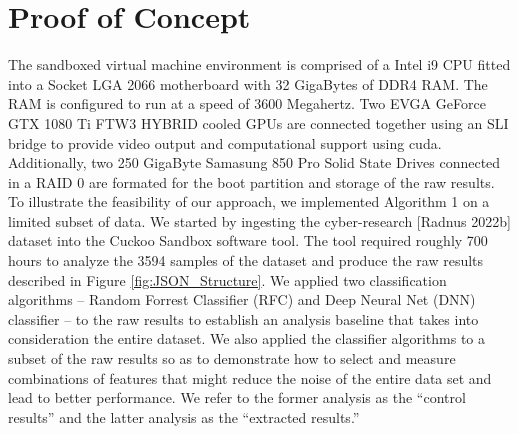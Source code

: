 \documentclass[12pt]{report}
\begin{document}
\section{Proof of Concept}
The sandboxed virtual machine environment is comprised of a Intel i9 CPU fitted into a Socket LGA 2066 motherboard with 32 GigaBytes of DDR4 RAM.  The RAM is configured to run at a speed of 3600 Megahertz.  Two EVGA GeForce GTX 1080 Ti FTW3 HYBRID cooled GPUs are connected together using an SLI bridge to provide video output and computational support using cuda.  Additionally, two 250 GigaByte Samasung 850 Pro Solid State Drives connected in a RAID 0 are formated for the boot partition and storage of the raw results.  To illustrate the feasibility of our approach, we implemented Algorithm 1 on a limited subset of data.  We started by ingesting the cyber-research [Radnus 2022b] dataset into the Cuckoo Sandbox software tool.  The tool required roughly 700 hours to analyze the 3594 samples of the dataset and produce the raw results described in Figure \ref{fig:JSON_Structure}.  We applied two classification algorithms – Random Forrest Classifier (RFC) and Deep Neural Net (DNN) classifier -- to the raw results to establish an analysis baseline that takes into consideration the entire dataset.  We also applied the classifier algorithms to a subset of the raw results so as to demonstrate how to select and measure combinations of features that might reduce the noise of the entire data set and lead to better performance.  We refer to the former analysis as the “control results” and the latter analysis as the “extracted results.”
\end{document}
